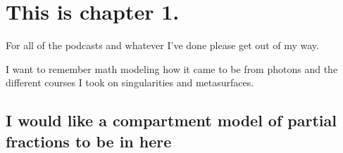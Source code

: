 \chapter{This is chapter 1.}

For all of the podcasts and whatever I've done please get out of my way. 

I want to remember math modeling how it came to be from photons and the different courses I took on singularities and metasurfaces. 

\section{I would like a compartment model of partial fractions to be in here}